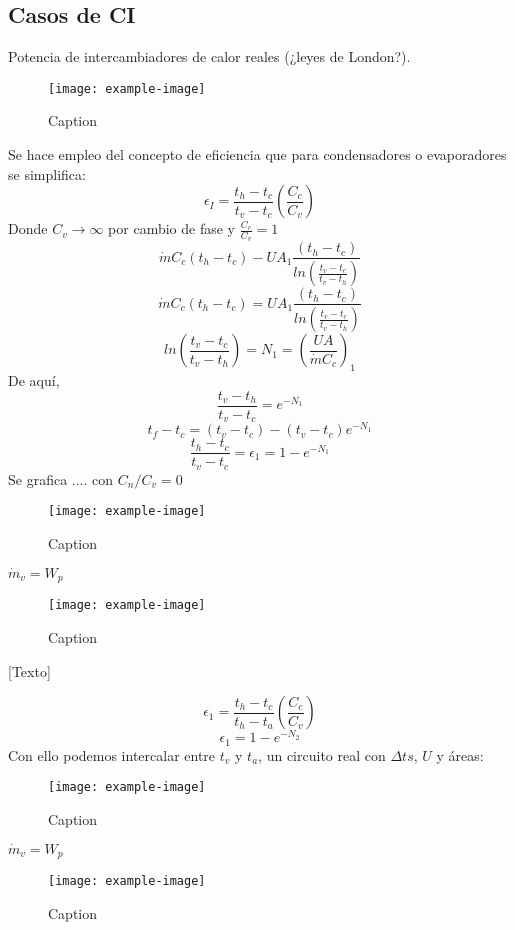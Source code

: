 \documentclass{article}
\begin{document}
\subsection{Casos de CI}
Potencia de intercambiadores de calor reales (¿leyes de London?).
\begin{figure}[H]
    \centering
    \texttt{[image: example-image]}
    \caption{Caption}
\end{figure}
Se hace empleo del concepto de eficiencia que para condensadores o evaporadores se simplifica:
\begin{equation}
    \epsilon_I=\frac{t_h-t_c}{t_v-t_c}\left(\frac{C_c}{C_v}\right)
\end{equation}
Donde $C_v\xrightarrow{}\infty$ por cambio de fase y $\frac{C_c}{C_v}=1$
\begin{equation}
    \dot{m}C_c\left(t_h-t_c\right)-UA_1\frac{\left(t_h-t_c\right)}{ln\left(\frac{t_v-t_c}{t_v-t_h}\right)}
\end{equation}
\begin{equation}
    \dot{m}C_c\left(t_h-t_c\right)=UA_1\frac{\left(t_h-t_c\right)}{ln\left(\frac{t_v-t_c}{t_v-t_h}\right)}
\end{equation}
\begin{equation}
    ln\left(\frac{t_v-t_c}{t_v-t_h}\right)=N_1=\left(\frac{UA}{\dot{m}C_c}\right)_1
\end{equation}
De aquí,
\begin{equation}
    \frac{t_v-t_h}{t_v-t_c}=e^{-N_1}
\end{equation}
\begin{equation}
    t_f-t_c=\left(t_v-t_c\right)-\left(t_v-t_c\right)e^{-N_1}
\end{equation}
\begin{equation}
    \frac{t_h-t_c}{t_v-t_c}=\epsilon_1=1-e^{-N_1}
\end{equation}
Se grafica .... con $C_n/C_v=0$
\begin{figure}[H]
    \centering
    \texttt{[image: example-image]}
    \caption{Caption}
\end{figure}
$\dot{m}_v=W_p$
\begin{figure}[H]
    \centering
    \texttt{[image: example-image]}
    \caption{Caption}
\end{figure}
[Texto]

\begin{equation}
    \epsilon_1=\frac{t_h-t_c}{t_h-t_a}\left(\frac{C_c}{C_v}\right)
\end{equation}
\begin{equation}
    \epsilon_1=1-e^{-N_2}
\end{equation}
Con ello podemos intercalar entre $t_v$ y $t_a$, un circuito real con $\Delta{ts}$, $U$ y áreas:
\begin{figure}[H]
    \centering
    \texttt{[image: example-image]}
    \caption{Caption}
\end{figure}
$\dot{m}_v=W_p$
\begin{figure}[H]
    \centering
    \texttt{[image: example-image]}
    \caption{Caption}
\end{figure}
\end{document}
